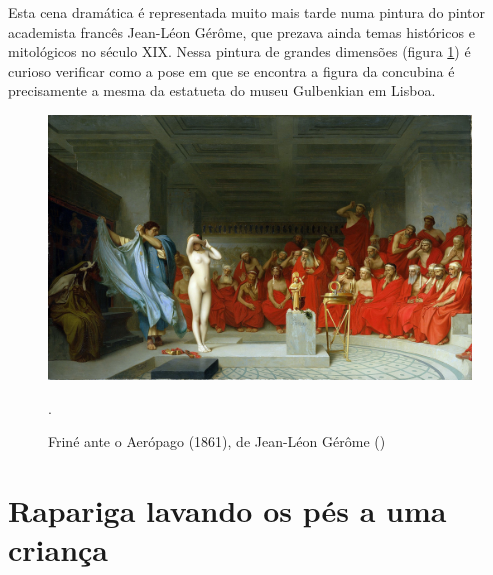 \documentclass{article}
\begin{document}
Esta cena dramática é representada muito mais tarde numa pintura do
pintor academista francês Jean-Léon Gérôme, que prezava ainda temas
históricos e mitológicos no século XIX. Nessa pintura de grandes
dimensões (figura \ref{fig:3}) é curioso verificar como a pose em que
se encontra a figura da concubina é precisamente a mesma da estatueta
do museu Gulbenkian em Lisboa.

\begin{figure}
\centering\includegraphics[height=0.3\textheight,keepaspectratio]
                          {frine.jpg}
  \caption{Friné ante o Aerópago (1861), de Jean-Léon Gérôme (\cite{gerome})}.
  \label{fig:3}
\end{figure}

\section{Rapariga lavando os pés a uma criança}
\end{document}

